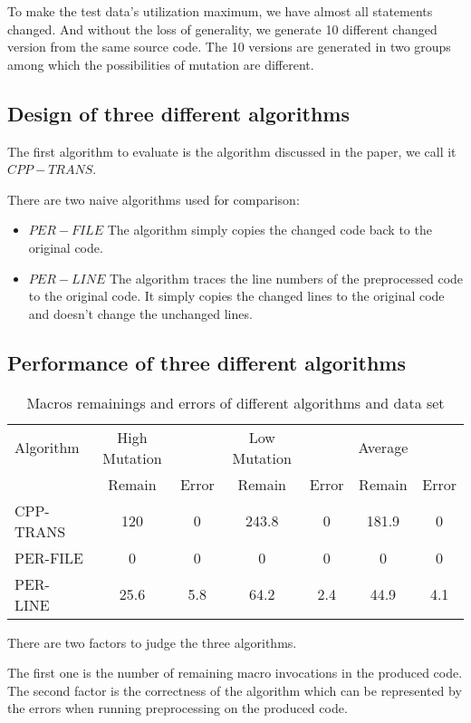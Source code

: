 To make the test data's utilization maximum, we have almost all statements changed. And without the loss of generality, we generate 10 different changed version from the same source code.
The 10 versions are generated in two groups among which the possibilities of mutation are different.

\subsection{Design of three different algorithms}
The first algorithm to evaluate is the algorithm discussed in the paper, we call it $CPP-TRANS$.

There are two naive algorithms used for comparison:
\begin{itemize}
\item $PER-FILE$ The algorithm simply copies the changed code back to the original code.
\item $PER-LINE$ The algorithm traces the line numbers of the preprocessed code to the original code. It simply copies the changed lines to the original code and doesn't change the unchanged lines.
\end{itemize}

\subsection{Performance of three different algorithms}
\begin{table*}[htbp]
\centering
\begin{tabular}{l|cc|cc|cc}
\hline
Algorithm  &High Mutation & &Low Mutation & &Average &  \\
 &Remain &Error &Remain &Error &Remain &Error \\
\hline
CPP-TRANS &120 &0 &243.8 &0 &181.9 &0 \\
PER-FILE &0 &0 &0 &0 &0 &0  \\
PER-LINE &25.6 &5.8 &64.2 &2.4 &44.9 &4.1 \\
\hline
\end{tabular}
\caption{Macros remainings and errors of different algorithms and data set}
\end{table*}

There are two factors to judge the three algorithms.

The first one is the number of remaining macro invocations in the produced code.
The second factor is the correctness of the algorithm which can be represented by the errors when running preprocessing on the produced code.

